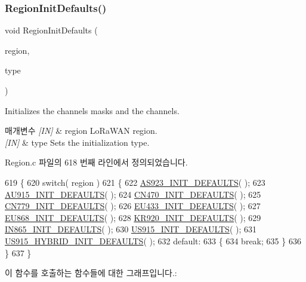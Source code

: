 \subsubsection{\texorpdfstring{Region\+Init\+Defaults()}{RegionInitDefaults()}}
{\footnotesize\ttfamily void Region\+Init\+Defaults (\begin{DoxyParamCaption}\item[{\mbox{\hyperlink{group___l_o_r_a_m_a_c_ga80c48efda9ae02e14b58160d34a798dd}{Lo\+Ra\+Mac\+Region\+\_\+t}}}]{region,  }\item[{\mbox{\hyperlink{group___r_e_g_i_o_n_gaddc73ae10673ec925724e7870363bda9}{Init\+Type\+\_\+t}}}]{type }\end{DoxyParamCaption})}



Initializes the channels masks and the channels. 


\begin{DoxyParams}{매개변수}
{\em \mbox{[}\+I\+N\mbox{]}} & region Lo\+Ra\+W\+AN region.\\
\hline
{\em \mbox{[}\+I\+N\mbox{]}} & type Sets the initialization type. \\
\hline
\end{DoxyParams}


Region.\+c 파일의 618 번째 라인에서 정의되었습니다.


\begin{DoxyCode}
619 \{
620     \textcolor{keywordflow}{switch}( region )
621     \{
622         \mbox{\hyperlink{_region_8c_abbf363ff3aa9fb94c3ef7aba1bc4e48b}{AS923\_INIT\_DEFAULTS}}( );
623         \mbox{\hyperlink{_region_8c_a8bbb7226a1cfed5ea6821b1510748147}{AU915\_INIT\_DEFAULTS}}( );
624         \mbox{\hyperlink{_region_8c_a3ca20e316d44b9de75598144390898c7}{CN470\_INIT\_DEFAULTS}}( );
625         \mbox{\hyperlink{_region_8c_a7a78bccace6549bce4db9c7130a20459}{CN779\_INIT\_DEFAULTS}}( );
626         \mbox{\hyperlink{_region_8c_a0695b0658b217595d36c85d2cac1f2a5}{EU433\_INIT\_DEFAULTS}}( );
627         \mbox{\hyperlink{_region_8c_ac19aa144614734658477e56d454897cd}{EU868\_INIT\_DEFAULTS}}( );
628         \mbox{\hyperlink{_region_8c_a62f53ef325d4eb50f2a9bdeb023a1be6}{KR920\_INIT\_DEFAULTS}}( );
629         \mbox{\hyperlink{_region_8c_a2acb5b53b6522584a1a451fb7a9e7c83}{IN865\_INIT\_DEFAULTS}}( );
630         \mbox{\hyperlink{_region_8c_a52b3e37b604e682672929d4e5402ee11}{US915\_INIT\_DEFAULTS}}( );
631         \mbox{\hyperlink{_region_8c_abc1487d10e8c54bcc07a3e4a215b2164}{US915\_HYBRID\_INIT\_DEFAULTS}}( );
632         \textcolor{keywordflow}{default}:
633         \{
634             \textcolor{keywordflow}{break};
635         \}
636     \}
637 \}
\end{DoxyCode}
이 함수를 호출하는 함수들에 대한 그래프입니다.\+:
\mbox{\label{group___r_e_g_i_o_n_ga3e5cf2322f71f8f9973718024b6fb782}} 

